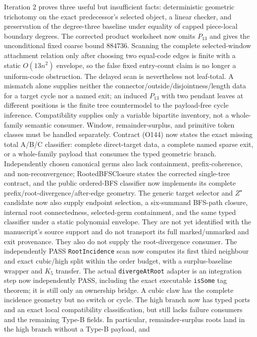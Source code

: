 \documentclass[11pt]{article}
\begin{document}
Iteration 2 proves three useful but insufficient facts: deterministic
geometric trichotomy on the exact predecessor's selected object, a linear
checker, and preservation of the degree-three baseline under equality of
capped piece-local boundary degrees.  The corrected product worksheet now
omits $P_{13}$ and gives the unconditional fixed coarse bound $884736$.
Scanning the complete selected-window attachment relation only after choosing
two equal-code edges is finite with a static $O(13n^2)$ envelope, so the false
fixed entry-count claim is no longer a uniform-code obstruction.  The delayed
scan is nevertheless not leaf-total.  A mismatch alone supplies neither the
connector/outside/disjointness/length data for a target cycle nor a named exit;
an induced $P_{13}$ with two pendant leaves at different positions is the
finite tree countermodel to the payload-free cycle inference.  Compatibility
supplies only a variable bipartite inventory, not a whole-family semantic
consumer.  Window, remainder-surplus, and primitive token classes must be
handled separately.  Contract (O144) now states the exact missing total A/B/C
classifier: complete direct-target data, a complete named sparse exit, or a
whole-family payload that consumes the typed geometric branch.  Independently
chosen canonical germs also lack containment,
prefix-coherence, and non-reconvergence; RootedBFSClosure states the corrected
single-tree contract, and the public ordered-BFS classifier now implements its
complete prefix/root-divergence/after-edge geometry.  The generic target
selector and $Z^\star$ candidate now also supply endpoint selection, a
six-summand BFS-path closure, internal root connectedness, selected-germ
containment, and the same typed classifier under a static polynomial envelope.
They are not yet identified with the manuscript's source support and do not
transport its full marked/unmarked and exit provenance.  They also do not
supply the root-divergence consumer.  The independently PASS
\texttt{RootIncidence} scan now computes its first third neighbour and exact
cubic/high split within the order budget, with a surplus-baseline wrapper and
$K_5$ transfer.  The actual \texttt{divergeAtRoot} adapter is an integration
step now independently PASS, including the exact executable \texttt{isSome}
tag theorem; it is still only an ownership bridge.  A cubic claw has the
complete incidence geometry but no switch or cycle.  The high branch now has
typed ports and an exact local compatibility classification, but still lacks
failure consumers and the remaining Type-B fields.  In particular,
remainder-surplus roots land in the high branch without a Type-B payload, and
\end{document}

